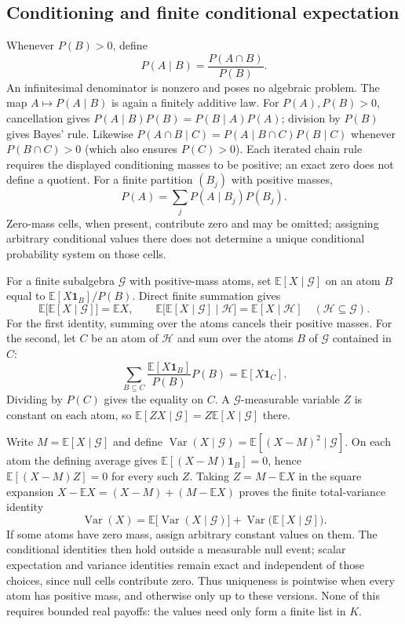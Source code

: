 \documentclass[11pt,a4paper]{article}
\numberwithin{equation}{section}
\theoremstyle{definition}
\theoremstyle{remark}
\newcommand{\E}{\mathbb E}
\newcommand{\Var}{\operatorname{Var}}
\newcommand{\ind}{\mathbf 1}
\begin{document}
\subsection{Conditioning and finite conditional expectation}

Whenever $P(B)>0$, define
\begin{equation}\label{fsp:eq:condition}
 P(A\mid B)=\frac{P(A\cap B)}{P(B)}.
\end{equation}
An infinitesimal denominator is nonzero and poses no algebraic problem.
The map $A\mapsto P(A\mid B)$ is again a finitely additive law.
For $P(A),P(B)>0$, cancellation gives
$P(A\mid B)P(B)=P(B\mid A)P(A)$; division by $P(B)$ gives Bayes' rule.
Likewise
$P(A\cap B\mid C)=P(A\mid B\cap C)P(B\mid C)$ whenever
$P(B\cap C)>0$ (which also ensures $P(C)>0$).
Each iterated chain rule requires the displayed conditioning masses to be
positive; an exact zero does not define a quotient.
For a finite partition $(B_j)$ with positive masses,
\begin{equation}
 P(A)=\sum_jP(A\mid B_j)P(B_j).
\end{equation}
Zero-mass cells, when present, contribute zero and may be omitted; assigning
arbitrary conditional values there does not determine a unique conditional
probability system on those cells.

For a finite subalgebra $\mathcal G$ with positive-mass atoms, set
$\E[X\mid\mathcal G]$ on an atom $B$ equal to
$\E[X\ind_B]/P(B)$. Direct finite summation gives
\begin{equation}\label{fsp:eq:tower}
 \E\bigl[\E[X\mid\mathcal G]\bigr]=\E X,\qquad
 \E\bigl[\E[X\mid\mathcal G]\mid\mathcal H\bigr]
 =\E[X\mid\mathcal H]\quad(\mathcal H\subseteq\mathcal G).
\end{equation}
For the first identity, summing over the atoms cancels their positive
masses. For the second, let $C$ be an atom of $\mathcal H$ and sum over
the atoms $B$ of $\mathcal G$ contained in $C$:
\[
 \sum_{B\subseteq C}\frac{\E[X\ind_B]}{P(B)}P(B)
 =\E[X\ind_C].
\]
Dividing by $P(C)$ gives the equality on $C$.
A $\mathcal G$-measurable variable $Z$ is constant on each atom, so
$\E[ZX\mid\mathcal G]=Z\E[X\mid\mathcal G]$ there.

Write $M=\E[X\mid\mathcal G]$ and define
$\Var(X\mid\mathcal G)=\E[(X-M)^2\mid\mathcal G]$.
On each atom the defining average gives
$\E[(X-M)\ind_B]=0$, hence $\E[(X-M)Z]=0$ for every such $Z$.
Taking $Z=M-\E X$ in the square expansion
$X-\E X=(X-M)+(M-\E X)$ proves the finite total-variance identity
\begin{equation}
 \Var(X)=\E\bigl[\Var(X\mid\mathcal G)\bigr]
       +\Var\bigl(\E[X\mid\mathcal G]\bigr).
\end{equation}
If some atoms have zero mass, assign arbitrary constant values on them.
The conditional identities then hold outside a measurable null event;
scalar expectation and variance identities remain exact and independent
of those choices, since null cells contribute zero. Thus uniqueness is
pointwise when every atom has positive mass, and otherwise only up to
these versions. None of this requires bounded real payoffs: the values
need only form a finite list in $K$.
\end{document}
